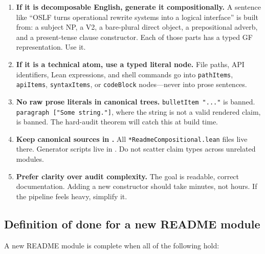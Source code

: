 \documentclass[11pt]{article}
\newcommand{\code}[1]{\texttt{#1}}
\newcommand{\codepath}[1]{\path{#1}}
\begin{document}
\begin{enumerate}
\item \textbf{If it is decomposable English, generate it compositionally.}
  A sentence like ``OSLF turns operational rewrite systems into a logical interface''
  is built from: a subject NP, a V2, a bare-plural direct object, a prepositional
  adverb, and a present-tense clause constructor.
  Each of those parts has a typed GF representation.  Use it.

\item \textbf{If it is a technical atom, use a typed literal node.}
  File paths, API identifiers, Lean expressions, and shell commands go into
  \code{pathItems}, \code{apiItems}, \code{syntaxItems}, or \code{codeBlock}
  nodes---never into prose sentences.

\item \textbf{No raw prose literals in canonical trees.}
  \code{bulletItem "..."} is banned.  \code{paragraph ["Some string."]},
  where the string is not a valid rendered claim, is banned.
  The hard-audit theorem will catch this at build time.

\item \textbf{Keep canonical sources in \codepath{Mettapedia/DocText/}.}
  All \code{*ReadmeCompositional.lean} files live there.
  Generator scripts live in \codepath{scripts/}.
  Do not scatter claim types across unrelated modules.

\item \textbf{Prefer clarity over audit complexity.}
  The goal is readable, correct documentation.  Adding a new constructor should
  take minutes, not hours.  If the pipeline feels heavy, simplify it.
\end{enumerate}

\subsection{Definition of done for a new README module}

A new README module is complete when all of the following hold:
\end{document}

